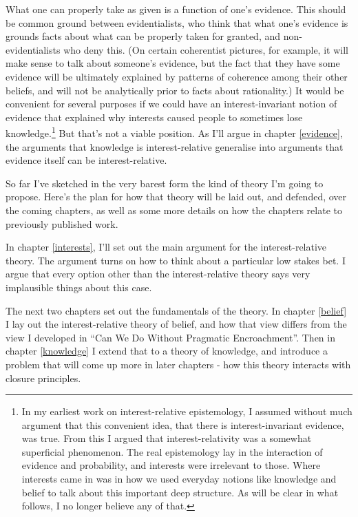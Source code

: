 \documentclass[
  11pt,
]{book}
\begin{document}
What one can properly take as given is a function of one's evidence. This should be common ground between evidentialists, who think that what one's evidence is grounds facts about what can be properly taken for granted, and non-evidentialists who deny this. (On certain coherentist pictures, for example, it will make sense to talk about someone's evidence, but the fact that they have some evidence will be ultimately explained by patterns of coherence among their other beliefs, and will not be analytically prior to facts about rationality.) It would be convenient for several purposes if we could have an interest-invariant notion of evidence that explained why interests caused people to sometimes lose knowledge.\footnote{In my earliest work on interest-relative epistemology, I assumed without much argument that this convenient idea, that there is interest-invariant evidence, was true. From this I argued that interest-relativity was a somewhat superficial phenomenon. The real epistemology lay in the interaction of evidence and probability, and interests were irrelevant to those. Where interests came in was in how we used everyday notions like knowledge and belief to talk about this important deep structure. As will be clear in what follows, I no longer believe any of that.} But that's not a viable position. As I'll argue in chapter \ref{evidence}, the arguments that knowledge is interest-relative generalise into arguments that evidence itself can be interest-relative.

So far I've sketched in the very barest form the kind of theory I'm going to propose. Here's the plan for how that theory will be laid out, and defended, over the coming chapters, as well as some more details on how the chapters relate to previously published work.

In chapter \ref{interests}, I'll set out the main argument for the interest-relative theory. The argument turns on how to think about a particular low stakes bet. I argue that every option other than the interest-relative theory says very implausible things about this case.

The next two chapters set out the fundamentals of the theory. In chapter \ref{belief} I lay out the interest-relative theory of belief, and how that view differs from the view I developed in ``Can We Do Without Pragmatic Encroachment''. Then in chapter \ref{knowledge} I extend that to a theory of knowledge, and introduce a problem that will come up more in later chapters - how this theory interacts with closure principles.
\end{document}
